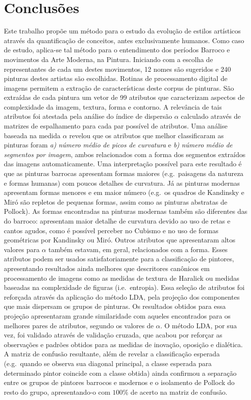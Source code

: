 \chapter{Conclusões}
\label{chap:conclusoes}

Este trabalho propõe um método para o estudo da evolução de estilos
artísticos através da quantificação de conceitos, antes exclusivamente
humanos. Como caso de estudo, aplica-se tal método para o entendimento
dos períodos Barroco e movimentos da Arte Moderna, na
Pintura. Iniciando com a escolha de representantes de cada um destes
movimentos, 12 nomes são sugeridos e 240 pinturas destes artistas são
escolhidas. Rotinas de processamento digital de imagens permitem a
extração de características deste corpus de pinturas. São extraídas de
cada pintura um vetor de 99 atributos que caracterizam aspectos de
complexidade da imagem, textura, forma e contorno.  A relevância de
tais atributos foi atestada pela análise do índice de dispersão
$\alpha$ calculado através de matrizes de espalhamento para cada par
possível de atributos. Uma análise baseada na medida $\alpha$ revelou
que os atributos que melhor classificaram as pinturas foram
\textit{a)} \emph{número médio de picos de curvatura} e \textit{b)}
\emph{número médio de segmentos por imagem}, ambos relacionados com a
forma dos segmentos extraídos das imagens automaticamente. Uma
interpretação possível para este resultado é que as pinturas barrocas
apresentam formas maiores (e.g.\ paisagens da natureza e formas
humanas) com poucos detalhes de curvatura. Já as pinturas modernas
apresentam formas menores e em maior número (e.g.\ os quadros de
Kandinsky e Miró são repletos de pequenas formas, assim como as
pinturas abstratas de Pollock). As formas encontradas na pinturas
modernas também são diferentes das do barroco: apresentam maior
detalhe de curvatura devido ao uso de retas e cantos agudos, como é
possível perceber no Cubismo e no uso de formas geométricas por
Kandinsky ou Miró. Outros atributos que apresentaram altos valores para
$\alpha$ também estavam, em geral, relacionados com a forma. Esses
atributos podem ser usados satisfatoriamente para a classificação de
pintores, apresentando resultados ainda melhores que descritores
canônicos em processamento de imagens como as medidas de textura de
Haralick ou medidas baseadas na complexidade de figuras
(i.e.\ entropia). Essa seleção de atributos foi reforçada através da
aplicação do método LDA, pela projeção dos componentes que mais
dispersam os grupos de pinturas. Os resultados obtidos para essa
projeção apresentaram grande similaridade com aqueles encontrados para
os melhores pares de atributos, segundo os valores de $\alpha$. O
método LDA, por sua vez, foi validado através de validação cruzada,
que acabou por reforçar as observações e padrões obtidos para as
medidas de inovação, oposição e dialética. A matriz de confusão
resultante, além de revelar a classificação esperada (e.g.\ quando se
observa sua diagonal principal, a classe esperada para determinado
pintor coincide com a classe obtida) ainda confirmou a separação entre
os grupos de pintores barrocos e modernos e o isolamento de Pollock do
resto do grupo, apresentando-o com $100\%$ de acerto na matriz de
confusão.

